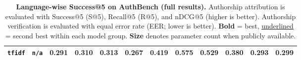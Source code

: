 \documentclass[11pt]{article}
\begin{document}
\begin{table}[htbp]
{\begin{tabular}{lccccccccccc}
\midrule
\texttt{tfidf} & \texttt{n/a} & \textbf{0.291} & \textbf{0.310} & \textbf{0.313} & \textbf{0.267} & \textbf{0.419} & \textbf{0.575} & \textbf{0.529} & \textbf{0.380} & \textbf{0.293} & \textbf{0.299} \\
\bottomrule
\end{tabular}
}
\caption{\textbf{Language-wise Success@5 on AuthBench (full results).} Authorship attribution is evaluated with Success@5 (S@5), Recall@5 (R@5), and nDCG@5 (higher is better). Authorship verification is evaluated with equal error rate (EER; lower is better). \textbf{Bold} = best, \underline{underlined} = second best within each model group. \textbf{Size} denotes parameter count when publicly available.}
\label{tab:lang-s5-full}
\end{table}

\end{document}

